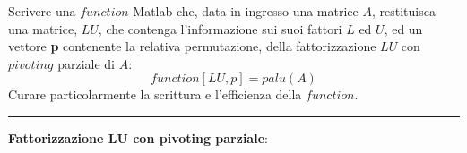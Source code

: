 Scrivere una $function$ Matlab che, data in ingresso una matrice $A$, restituisca una matrice, $LU$, che contenga l’informazione sui suoi fattori $L$ ed $U$, ed un vettore \textbf{p} contenente la relativa permutazione, della fattorizzazione $LU$ con $pivoting$ parziale di $A$:
$$function [LU,p] = palu(A)$$
Curare particolarmente la scrittura e l’efficienza della $function$.

\hspace{1cm}
\par\noindent\rule{\textwidth}{0.4pt}
\hspace{1cm}

\textbf{Fattorizzazione LU con pivoting parziale}:

